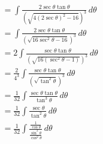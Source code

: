 \documentclass[preview]{standalone}
\begin{document}
\begin{align*}
&= \int \frac{2\sec\theta\tan\theta}{(\sqrt{4(2\sec\theta)^2-16})^3} \, d\theta \\ &=\int \frac{2\sec\theta\tan\theta}{(\sqrt{16\sec^2\theta-16})^3} \, d\theta \\ &=2\int \frac{\sec\theta\tan\theta}{(\sqrt{16(\sec^2\theta-1)})^3} \, d\theta \\ &=\frac{2}{4^3} \int \frac{\sec\theta\tan\theta}{(\sqrt{\tan^2\theta})^3} \, d\theta \\ &=\frac{1}{32} \int \frac{\sec\theta\tan\theta}{\tan^3\theta} \, d\theta \\ &=\frac{1}{32} \int \frac{\sec\theta}{\tan^2\theta }\, d\theta \\ &=\frac{1}{32} \int \frac{\frac{1}{\cos\theta}}{\frac{\sin^2\theta}{\cos^2\theta}} \, d\theta
\end{align*}
\end{document}
